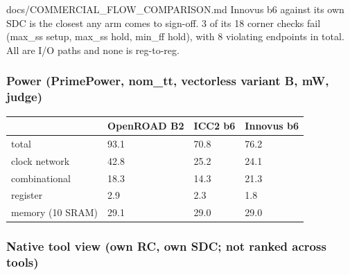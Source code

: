 \begin{relocated}{docs/COMMERCIAL_FLOW_COMPARISON.md}
Innovus b6 against its own SDC is the closest any arm comes to sign-off.
3 of its 18 corner checks fail (max\_ss setup, max\_ss hold, min\_ff
hold), with 8 violating endpoints in total. All are I/O paths and none
is reg-to-reg.

\subsubsection{Power (PrimePower, nom\_tt, vectorless variant B, mW,
judge)}\label{tm:pd:commercial-flow-comparison:44-power-primepower-nom-tt-vectorless-variant-b-mw-judge}

{
\begin{longtable}[]{@{}llll@{}}
\toprule\noalign{}
& OpenROAD B2 & ICC2 b6 & Innovus b6 \\
\midrule\noalign{}
\endhead
\bottomrule\noalign{}
\endlastfoot
total & 93.1 & 70.8 & 76.2 \\
clock network & 42.8 & 25.2 & 24.1 \\
combinational & 18.3 & 14.3 & 21.3 \\
register & 2.9 & 2.3 & 1.8 \\
memory (10 SRAM) & 29.1 & 29.0 & 29.0 \\
\end{longtable}
}

\subsubsection{Native tool view (own RC, own SDC; not ranked across
tools)}\label{tm:pd:commercial-flow-comparison:45-native-tool-view-own-rc-own-sdc-not-ranked-across-tools}

{\footnotesize\setlength{\tabcolsep}{3pt}

}
\end{relocated}
